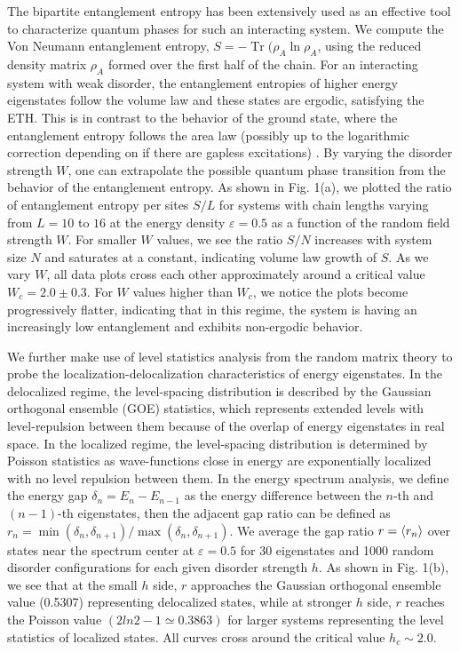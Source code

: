 \documentclass[prl,aps,epsf,showpacs,twocolumn]{revtex4}
\DeclareMathOperator{\tr}{Tr}
\begin{document}
The bipartite entanglement entropy has been extensively used as an effective tool 
to characterize quantum phases for such an interacting system\cite{nandkishore2015,
luitz2015, kjall2014}. We compute the Von Neumann entanglement entropy, $S = -\tr(\rho_A
\ln\rho_A$, using the reduced density matrix $\rho_A$ formed over the first half of
the chain. For an interacting system with weak disorder, the entanglement entropies
of higher energy eigenstates follow the volume law and these states are ergodic,
satisfying the ETH\cite{nandkishore2015, altman2015}. This is in contrast to the
behavior of the ground state, where the entanglement entropy follows the area law
(possibly up to the logarithmic correction depending on if there are gapless excitations)
\cite{grover2014}.
By varying the disorder strength $W$, one can extrapolate the possible quantum phase
transition from the behavior of the entanglement entropy\cite{kjall2014, luitz2015}.
As shown in Fig. 1(a), we plotted the ratio of entanglement entropy per sites $S/L$ for
systems with chain lengths varying from $L=10$ to $16$ at the energy density
$\varepsilon =0.5$ as a function of the random field strength $W$. For smaller $W$
values, we see the ratio $S/N$ increases with system size $N$ and saturates at a
constant, indicating volume law growth of $S$. As we vary $W$, all data plots
cross each other approximately around a critical value $W_c = 2.0\pm 0.3$. For $W$ values
higher than $W_c$, we notice the plots become progressively flatter, indicating that
in this regime, the system is having an increasingly low entanglement and exhibits
non-ergodic behavior.


We further make use of level statistics analysis from the random matrix theory
\cite{atas2013,oganesyan2007} to probe the localization-delocalization characteristics
of energy eigenstates. In the delocalized regime, the level-spacing distribution
is described by the Gaussian orthogonal ensemble (GOE) statistics, which represents
extended levels with level-repulsion between them because of the overlap of
energy eigenstates in real space. In the localized regime, the level-spacing
distribution is determined by Poisson statistics as wave-functions close in energy
are exponentially localized with no level repulsion between them\cite{mehta1991}.
In the energy spectrum analysis\cite{luitz2015}, we define the energy gap
$\delta_n=E_n-E_{n-1}$ as the energy difference between the $n$-th and $(n-1)$-th
eigenstates, then the adjacent gap ratio can be defined as
$r_n=\min(\delta_n, \delta_{n+1})/\max(\delta_n, \delta_{n+1})$.
We average the gap ratio $r=\braket{r_n}$ over states near the spectrum center at
$\varepsilon=0.5$ for 30 eigenstates and 1000 random disorder configurations
for each given disorder strength $h$. As shown in Fig. 1(b), we see that at the small
$h$ side, $r$ approaches the Gaussian orthogonal ensemble value (0.5307) representing
delocalized states, while at stronger $h$ side, $r$ reaches the Poisson value
$(2ln2-1\simeq 0.3863)$ for larger systems representing the level statistics of
localized states. All curves cross around the critical value $h_c \sim 2.0$. 
\end{document}
